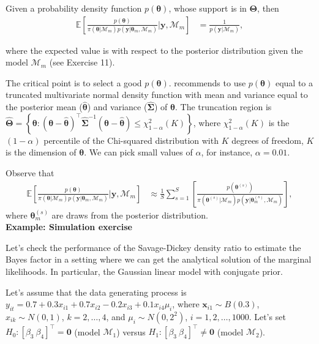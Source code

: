 Given a probability density function $p(\bm{\theta})$, whose support is in $\bm{\Theta}$, then
\begin{align*}
	\mathbb{E}\left[\frac{p(\bm{\theta})}{\pi(\bm{\theta}|\mathcal{M}_m)p(\bm{y}|\bm{\theta}_m,\mathcal{M}_m)}\biggr\rvert \bm{y},\mathcal{M}_m\right]&=\frac{1}{p(\bm{y}|\mathcal{M}_m)},
\end{align*} 

where the expected value is with respect to the posterior distribution given the model $\mathcal{M}_m$ (see Exercise 11).

The critical point is to select a good $p(\bm{\theta})$. \cite{geweke1999using} recommends to use $p(\bm{\theta})$ equal to a truncated multivariate normal density function with mean and variance equal to the posterior mean ($\hat{\bm{\theta}}$) and variance ($\hat{\bm{\Sigma}}$) of $\bm{\theta}$. The truncation region is $\hat{\bm{\Theta}}=\left\{\bm{\theta}:(\bm{\theta}-\hat{\bm{\theta}})^{\top}\hat{\bm{\Sigma}}^{-1}(\bm{\theta}-\hat{\bm{\theta}})\leq \chi_{1-\alpha}^2(K)\right\}$, where $\chi_{1-\alpha}^2(K)$ is the $(1-\alpha)$ percentile of the Chi-squared distribution with $K$ degrees of freedom, $K$ is the dimension of $\bm{\theta}$. We can pick small values of $\alpha$, for instance, $\alpha=0.01$.

Observe that 
\begin{align*}
	\mathbb{E}\left[\frac{p(\bm{\theta})}{\pi(\bm{\theta}|\mathcal{M}_m)p(\bm{y}|\bm{\theta}_m,\mathcal{M}_m)}\biggr\rvert \bm{y},\mathcal{M}_m\right]&\approx \frac{1}{S}\sum_{s=1}^S \left[\frac{p(\bm{\theta}^{(s)})}{\pi(\bm{\theta}^{(s)}|\mathcal{M}_m)p(\bm{y}|\bm{\theta}^{(s)}_m,\mathcal{M}_m)}\right],
\end{align*}
where $\bm{\theta}^{(s)}_m$ are draws from the posterior distribution.\\
    

\textbf{Example: Simulation exercise}

Let's check the performance of the Savage-Dickey density ratio to estimate the Bayes factor in a setting where we can get the analytical solution of the marginal likelihoods. In particular, the Gaussian linear model with conjugate prior.

Let's assume that the data generating process is $y_{it}=0.7+0.3x_{i1}+0.7x_{i2}-0.2x_{i3}+0.1x_{i4}\mu_i$, where $\bm{x}_{i1}\sim B(0.3)$, $x_{ik}\sim N(0,1)$, $k=2,\dots,4$, and $\mu_i\sim N(0,2^2)$, $i=1,2,\dots,1000$. Let's set $H_0:[\beta_3 \ \beta_4]^{\top}=\bm{0}$ (model $\mathcal{M}_1$) versus $H_1:[\beta_3 \ \beta_4]^{\top}\neq\bm{0}$ (model $\mathcal{M}_2$).

